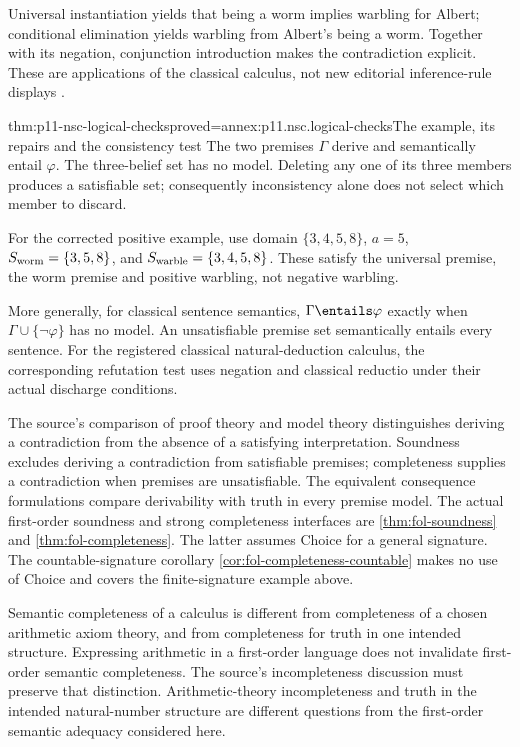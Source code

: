 Universal instantiation yields that being a worm implies warbling for
Albert; conditional elimination yields warbling from Albert's being a
worm. Together with its negation, conjunction introduction makes the
contradiction explicit. These are applications of the classical calculus,
not new editorial inference-rule displays
\cite[pp.~12--14]{ChaterOaksford2012NormativeSystems}.

\begin{hbtheorem}{thm:p11-nsc-logical-checks}{proved=annex:p11.nsc.logical-checks}{The example, its repairs and the consistency test}
The two premises \(\Gamma\) derive and semantically entail \(\varphi\).
The three-belief set has no model. Deleting any one of its three members
produces a satisfiable set; consequently inconsistency alone does not
select which member to discard.

For the corrected positive example, use domain \(\{3,4,5,8\}\),
\(a=5\), \(S_{\rm worm}=\{3,5,8\}\), and
\(S_{\rm warble}=\{3,4,5,8\}\). These satisfy the universal premise,
the worm premise and positive warbling, not negative warbling.

More generally, for classical sentence semantics,
\(\Gamma\entails\varphi\) exactly when
\(\Gamma\cup\{\neg\varphi\}\) has no model. An unsatisfiable
premise set semantically entails every sentence. For the registered
classical natural-deduction calculus, the corresponding refutation test
uses negation and classical reductio under their actual discharge conditions.
\end{hbtheorem}

The source's comparison of proof theory and model theory distinguishes
deriving a contradiction from the absence of a satisfying interpretation.
Soundness excludes deriving a contradiction from satisfiable premises;
completeness supplies a contradiction when premises are unsatisfiable.
The equivalent consequence formulations compare derivability with truth
in every premise model. The actual first-order soundness and strong
completeness interfaces are \ref{thm:fol-soundness} and
\ref{thm:fol-completeness}. The latter assumes Choice for a general
signature. The countable-signature corollary
\ref{cor:fol-completeness-countable} makes no use of Choice and covers
the finite-signature example above.

Semantic completeness of a calculus is different from completeness of
a chosen arithmetic axiom theory, and from completeness for truth in
one intended structure. Expressing arithmetic in a first-order language
does not invalidate first-order semantic completeness. The source's
incompleteness discussion must preserve that distinction. Arithmetic-theory
incompleteness and truth in the intended natural-number structure are
different questions from the first-order semantic adequacy considered here.

